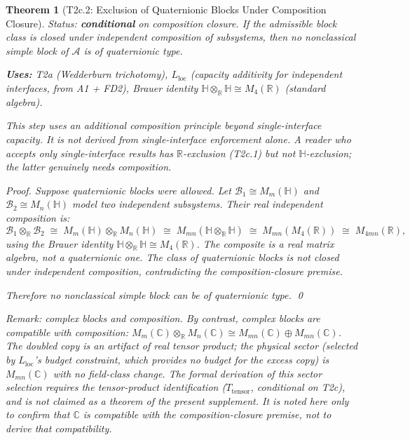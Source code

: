 \documentclass[11pt,a4paper]{article}
\newtheorem{theorem}{Theorem}[section]
\theoremstyle{definition}
\begin{document}
\begin{theorem}[T2c.2: Exclusion of Quaternionic Blocks Under Composition Closure]\label{thm:T2c2}
\textit{Status: \textbf{conditional} on composition closure.}  If the admissible block class is closed under independent composition of subsystems, then no nonclassical simple block of $\mathcal{A}$ is of quaternionic type.

\smallskip\noindent\textbf{Uses:} T2a (Wedderburn trichotomy), $L_{\mathrm{loc}}$ (capacity additivity for independent interfaces, from A1 + FD2), Brauer identity $\mathbb{H} \otimes_\mathbb{R} \mathbb{H} \cong M_4(\mathbb{R})$ (standard algebra).

\smallskip\noindent\textit{This step uses an additional composition principle beyond single-interface capacity.  It is not derived from single-interface enforcement alone.  A reader who accepts only single-interface results has $\mathbb{R}$-exclusion (T2c.1) but not $\mathbb{H}$-exclusion; the latter genuinely needs composition.}

\smallskip\noindent\textit{Proof.}
Suppose quaternionic blocks were allowed.  Let $\mathcal{B}_1 \cong M_m(\mathbb{H})$ and $\mathcal{B}_2 \cong M_n(\mathbb{H})$ model two independent subsystems.  Their real independent composition is:
\[
\mathcal{B}_1 \otimes_\mathbb{R} \mathcal{B}_2 \;\cong\; M_m(\mathbb{H}) \otimes_\mathbb{R} M_n(\mathbb{H}) \;\cong\; M_{mn}(\mathbb{H} \otimes_\mathbb{R} \mathbb{H}) \;\cong\; M_{mn}(M_4(\mathbb{R})) \;\cong\; M_{4mn}(\mathbb{R}),
\]
using the Brauer identity $\mathbb{H} \otimes_\mathbb{R} \mathbb{H} \cong M_4(\mathbb{R})$.  The composite is a real matrix algebra, not a quaternionic one.  The class of quaternionic blocks is not closed under independent composition, contradicting the composition-closure premise.

Therefore no nonclassical simple block can be of quaternionic type.  \qed

\smallskip\noindent\textit{Remark: complex blocks and composition.}  By contrast, complex blocks are compatible with composition: $M_m(\mathbb{C}) \otimes_\mathbb{R} M_n(\mathbb{C}) \cong M_{mn}(\mathbb{C}) \oplus M_{mn}(\mathbb{C})$.  The doubled copy is an artifact of real tensor product; the physical sector (selected by $L_{\mathrm{loc}}$'s budget constraint, which provides no budget for the excess copy) is $M_{mn}(\mathbb{C})$ with no field-class change.  The formal derivation of this sector selection requires the tensor-product identification ($T_{\mathrm{tensor}}$, conditional on T2c), and is not claimed as a theorem of the present supplement.  It is noted here only to confirm that $\mathbb{C}$ is compatible with the composition-closure premise, not to derive that compatibility.
\end{theorem}
\end{document}
